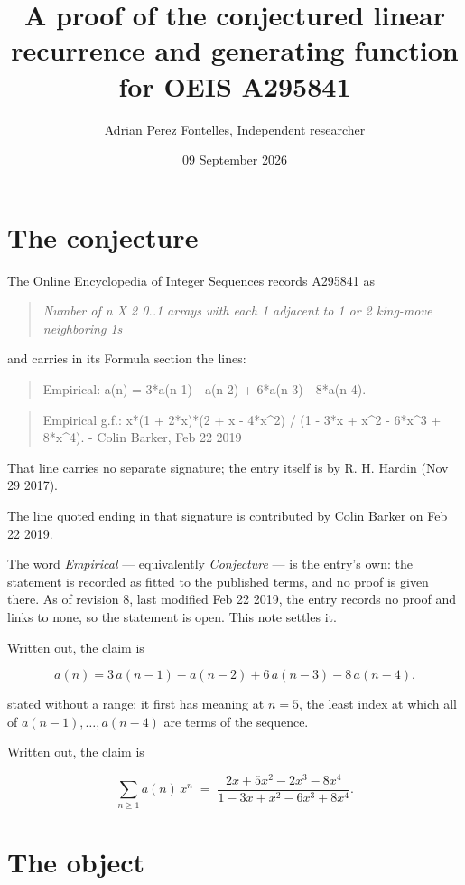 \documentclass[11pt]{article}
\title{A proof of the conjectured linear recurrence and generating function for OEIS A295841}
\author{Adrian Perez Fontelles, Independent researcher}
\date{09 September 2026}
\theoremstyle{definition}
\begin{document}
\maketitle
\section{The conjecture}

The Online Encyclopedia of Integer Sequences records \href{https://oeis.org/A295841}{A295841} as

\begin{quote}\itshape Number of n X 2 0..1 arrays with each 1 adjacent to 1 or 2 king-move neighboring 1s\end{quote}

and carries in its Formula section the lines:

\begin{quote}\ttfamily Empirical: a(n) = 3*a(n-1) - a(n-2) + 6*a(n-3) - 8*a(n-4).\end{quote}

\begin{quote}\ttfamily Empirical g.f.: x*(1 + 2*x)*(2 + x - 4*x\textasciicircum{}2) / (1 - 3*x + x\textasciicircum{}2 - 6*x\textasciicircum{}3 + 8*x\textasciicircum{}4). - Colin Barker, Feb 22 2019\end{quote}

That line carries no separate signature; the entry itself is by R. H. Hardin (Nov 29 2017).

The line quoted ending in that signature is contributed by Colin Barker on Feb 22 2019.

The word {\itshape Empirical} --- equivalently {\itshape Conjecture} --- is the entry's own: the statement is recorded as fitted to the published terms, and no proof is given there. As of revision 8, last modified Feb 22 2019, the entry records no proof and links to none, so the statement is open. This note settles it.

Written out, the claim is

\[a(n) = 3\,a(n-1) - a(n-2) + 6\,a(n-3) - 8\,a(n-4).\]

stated without a range; it first has meaning at $n = 5$, the least index at which all of $a(n-1),\dots,a(n-4)$ are terms of the sequence.

Written out, the claim is

\[\sum_{n \ge 1} a(n)\,x^n \;=\; \frac{2x + 5x^{2} - 2x^{3} - 8x^{4}}{1 - 3x + x^{2} - 6x^{3} + 8x^{4}}.\]

\section{The object}
\end{document}

